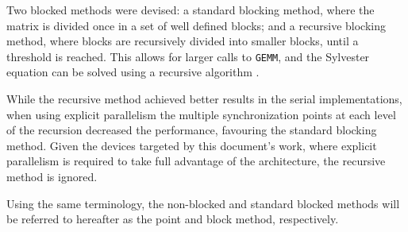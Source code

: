 \documentclass[../thesis]{subfiles}
\begin{document}
		Two blocked methods were devised: a standard blocking method, where the matrix is divided once in a set of well defined blocks; and a recursive blocking method, where blocks are recursively divided into smaller blocks, until a threshold is reached. This allows for larger calls to \texttt{GEMM}, and the Sylvester equation can be solved using a recursive algorithm \cite{Jonsson:Kagstrom:2002}.

		While the recursive method achieved better results in the serial implementations, when using explicit parallelism the multiple synchronization points at each level of the recursion decreased the performance, favouring the standard blocking method. Given the devices targeted by this document's work, where explicit parallelism is required to take full advantage of the architecture, the recursive method is ignored.

		Using the same terminology, the non-blocked and standard blocked methods will be referred to hereafter as the point and block method, respectively.

		
\end{document}
